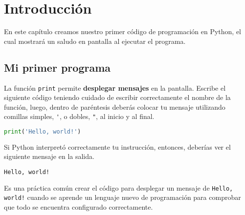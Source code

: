 \chapter{Introducción}

En este capítulo creamos nuestro primer código de programación en Python, el cual mostrará un saludo en pantalla al ejecutar el programa.

\section{Mi primer programa}

La función \lstinline|print| permite \textbf{desplegar mensajes} en la pantalla. Escribe el siguiente código teniendo cuidado de escribir
correctamente el nombre de la función, luego, dentro de paréntesis deberás colocar tu mensaje utilizando comillas simples, \lstinline|'|, o dobles, \lstinline|"|, al inicio
y al final.

\begin{lstlisting}[language=Python]
print('Hello, world!')
\end{lstlisting}

Si Python interpretó correctamente tu instrucción, entonces, deberías ver el siguiente mensaje en la salida.

\begin{lstlisting}[numbers=none]
Hello, world!
\end{lstlisting}

Es una práctica común crear el código para desplegar un mensaje de \lstinline|Hello, world!| cuando se aprende un lenguaje nuevo
de programación para comprobar que todo se encuentra configurado correctamente.
